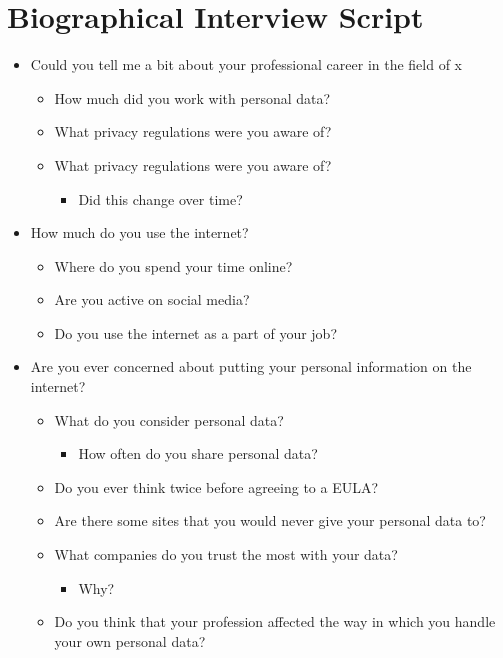 \documentclass[12pt,
 reprint,
nofootinbib,
 amsmath,amssymb,
 aps,
]{revtex4-2}
\begin{document}
\section{Biographical Interview Script}
\label{appendix:b}
\begin{itemize}
    \item Could you tell me a bit about your professional career in the field of x
    \begin{itemize}
        \item How much did you work with personal data?
        \item What privacy regulations were you aware of?
        \item What privacy regulations were you aware of?
        \begin{itemize}
            \item Did this change over time?
        \end{itemize}
    \end{itemize}
    \item How much do you use the internet?
        \begin{itemize}
        \item Where do you spend your time online?
        \item Are you active on social media?
        \item Do you use the internet as a part of your job?
    \end{itemize}
    \item Are you ever concerned about putting your personal information on the internet?
        \begin{itemize}
        \item What do you consider personal data?
        \begin{itemize}
            \item How often do you share personal data?
        \end{itemize}
        \item Do you ever think twice before agreeing to a EULA?
        \item Are there some sites that you would never give your personal data to?
        \item What companies do you trust the most with your data?
        \begin{itemize}
            \item Why?
        \end{itemize}
        \item Do you think that your profession affected the way in which you handle your own personal data?

\end{itemize}
\end{itemize}
\end{document}
